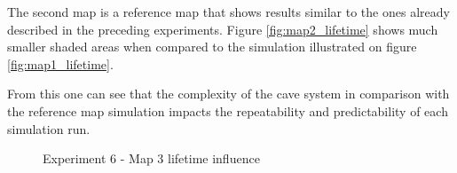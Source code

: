 The second map is a reference map that shows results similar to the ones already described in the preceding experiments.
Figure \ref{fig:map2_lifetime} shows much smaller shaded areas when compared to the simulation illustrated on figure \ref{fig:map1_lifetime}.

From this one can see that the complexity of the cave system in comparison with the reference map simulation impacts the repeatability and predictability of each simulation run.

\begin{figure}[H]
    \centering

    \hspace*{\fill}

    \hspace*{\fill}

    \caption{Experiment 6 - Map 3 lifetime influence}\label{fig:map3_lifetime}
\end{figure}

